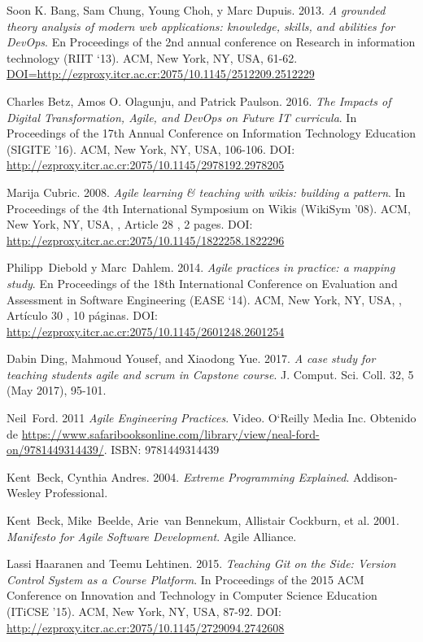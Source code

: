 \documentclass[journal]{IEEEtran}
\begin{document}
\begin{thebibliography}{1}
Soon K. Bang, Sam Chung, Young Choh, y Marc Dupuis. 2013. \emph{A grounded theory analysis of modern web applications: knowledge, skills, and abilities for DevOps}. En Proceedings of the 2nd annual conference on Research in information technology (RIIT `13). ACM, New York, NY, USA, 61-62. \url{DOI=http://ezproxy.itcr.ac.cr:2075/10.1145/2512209.2512229}

Charles Betz, Amos O. Olagunju, and Patrick Paulson. 2016. \emph{The Impacts of Digital Transformation, Agile, and DevOps on Future IT curricula}. In Proceedings of the 17th Annual Conference on Information Technology Education (SIGITE '16). ACM, New York, NY, USA, 106-106. DOI: \url{http://ezproxy.itcr.ac.cr:2075/10.1145/2978192.2978205}

Marija Cubric. 2008. \emph{Agile learning \& teaching with wikis: building a pattern}. In Proceedings of the 4th International Symposium on Wikis (WikiSym '08). ACM, New York, NY, USA, , Article 28 , 2 pages. DOI: \url{http://ezproxy.itcr.ac.cr:2075/10.1145/1822258.1822296}

Philipp~Diebold y Marc~Dahlem. 2014. \emph{Agile practices in practice: a mapping study}. En Proceedings of the 18th International Conference on Evaluation and Assessment in Software Engineering (EASE `14). ACM, New York, NY, USA, , Artículo 30 , 10 páginas. DOI: \url{http://ezproxy.itcr.ac.cr:2075/10.1145/2601248.2601254}

Dabin Ding, Mahmoud Yousef, and Xiaodong Yue. 2017. \emph{A case study for teaching students agile and scrum in Capstone course}. J. Comput. Sci. Coll. 32, 5 (May 2017), 95-101.
  
Neil~Ford. 2011 \emph{Agile Engineering Practices}. Video. O`Reilly Media Inc. Obtenido de \url{https://www.safaribooksonline.com/library/view/neal-ford-on/9781449314439/}. ISBN: 9781449314439

Kent~Beck, Cynthia Andres. 2004. \emph{Extreme Programming Explained}. Addison-Wesley Professional.

Kent~Beck, Mike~Beelde, Arie~van Bennekum, Allistair Cockburn, et al. 2001. \emph{Manifesto for Agile Software Development}. Agile Alliance. 

Lassi Haaranen and Teemu Lehtinen. 2015. \emph{Teaching Git on the Side: Version Control System as a Course Platform}. In Proceedings of the 2015 ACM Conference on Innovation and Technology in Computer Science Education (ITiCSE '15). ACM, New York, NY, USA, 87-92. DOI: \url{http://ezproxy.itcr.ac.cr:2075/10.1145/2729094.2742608}



\end{thebibliography}
\end{document}
